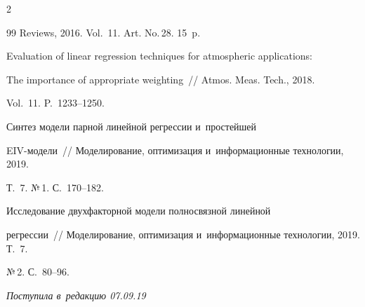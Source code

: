 \begin{multicols}{2}
{{\begin{thebibliography}{99}
Reviews, 2016. Vol.~11. Art. No.\,28. 15~p.







 Evaluation of linear regression techniques for atmospheric applications: 


The importance of appropriate weighting~// Atmos. Meas. Tech., 2018. 


Vol.~11. P.~1233--1250.







 Синтез модели парной линейной регрессии и~простейшей 


EIV-мо\-де\-ли~// Моделирование, оптимизация и~информационные технологии, 2019. 


Т.~7. №\,1. С.~170--182.




 Исследование двухфакторной модели полносвязной линейной 


регрессии~// Моделирование, оптимизация и~информационные технологии, 2019. Т.~7. 


№\,2. С.~80--96.


\end{thebibliography}





 }


 }





\end{multicols}





\vspace*{-6pt}





\hfill{\small\textit{Поступила в~редакцию 07.09.19}}





\vspace*{8pt}















